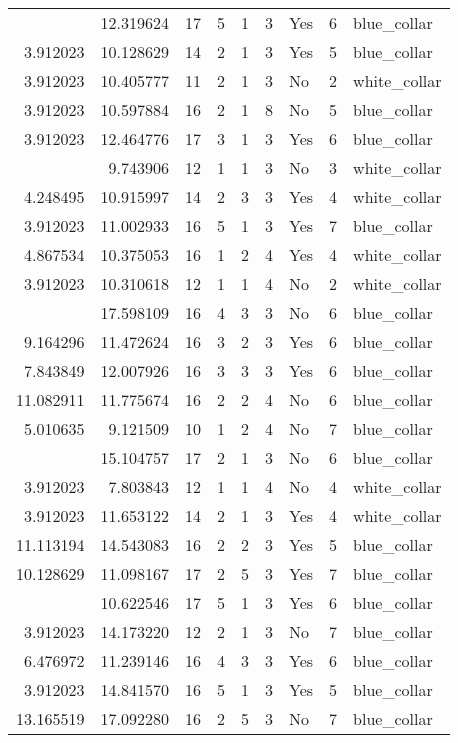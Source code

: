 \documentclass[
]{article}
\begin{document}
\begin{longtable}[t]{rrrrrllrl}
\addlinespace
3.912023 & 12.319624 & 17 & 5 & 1 & 3 & Yes & 6 & blue\_collar\\
3.912023 & 10.128629 & 14 & 2 & 1 & 3 & Yes & 5 & blue\_collar\\
3.912023 & 10.405777 & 11 & 2 & 1 & 3 & No & 2 & white\_collar\\
3.912023 & 10.597884 & 16 & 2 & 1 & 8 & No & 5 & blue\_collar\\
3.912023 & 12.464776 & 17 & 3 & 1 & 3 & Yes & 6 & blue\_collar\\
\addlinespace
3.912023 & 9.743906 & 12 & 1 & 1 & 3 & No & 3 & white\_collar\\
4.248495 & 10.915997 & 14 & 2 & 3 & 3 & Yes & 4 & white\_collar\\
3.912023 & 11.002933 & 16 & 5 & 1 & 3 & Yes & 7 & blue\_collar\\
4.867534 & 10.375053 & 16 & 1 & 2 & 4 & Yes & 4 & white\_collar\\
3.912023 & 10.310618 & 12 & 1 & 1 & 4 & No & 2 & white\_collar\\
\addlinespace
11.542970 & 17.598109 & 16 & 4 & 3 & 3 & No & 6 & blue\_collar\\
9.164296 & 11.472624 & 16 & 3 & 2 & 3 & Yes & 6 & blue\_collar\\
7.843849 & 12.007926 & 16 & 3 & 3 & 3 & Yes & 6 & blue\_collar\\
11.082911 & 11.775674 & 16 & 2 & 2 & 4 & No & 6 & blue\_collar\\
5.010635 & 9.121509 & 10 & 1 & 2 & 4 & No & 7 & blue\_collar\\
\addlinespace
3.912023 & 15.104757 & 17 & 2 & 1 & 3 & No & 6 & blue\_collar\\
3.912023 & 7.803843 & 12 & 1 & 1 & 4 & No & 4 & white\_collar\\
3.912023 & 11.653122 & 14 & 2 & 1 & 3 & Yes & 4 & white\_collar\\
11.113194 & 14.543083 & 16 & 2 & 2 & 3 & Yes & 5 & blue\_collar\\
10.128629 & 11.098167 & 17 & 2 & 5 & 3 & Yes & 7 & blue\_collar\\
\addlinespace
3.912023 & 10.622546 & 17 & 5 & 1 & 3 & Yes & 6 & blue\_collar\\
3.912023 & 14.173220 & 12 & 2 & 1 & 3 & No & 7 & blue\_collar\\
6.476972 & 11.239146 & 16 & 4 & 3 & 3 & Yes & 6 & blue\_collar\\
3.912023 & 14.841570 & 16 & 5 & 1 & 3 & Yes & 5 & blue\_collar\\
13.165519 & 17.092280 & 16 & 2 & 5 & 3 & No & 7 & blue\_collar\\

\end{longtable}
\end{document}
